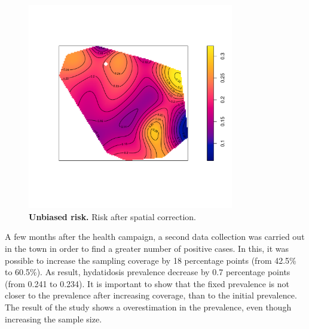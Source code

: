 \documentclass[10pt,letterpaper]{article}
\begin{document}
\begin{figure}[h]
\centering
\includegraphics[width=9cm]{images/risk_unbais.pdf}
\caption{{\bf Unbiased risk.} Risk after spatial correction.}
\label{risk_unbais}
\end{figure}


A few months after the health campaign, a second data collection was carried out in the town in order to find a greater number of positive cases. In this, it was possible to increase the sampling coverage by 18 percentage points (from 42.5\% to 60.5\%). As result, hydatidosis prevalence decrease by 0.7 percentage points (from 0.241 to 0.234). It is important to show that the fixed prevalence is not closer to the prevalence after increasing coverage, than to the initial prevalence.
The result of the study shows a overestimation in the prevalence, even though increasing the sample size.

\end{document}
